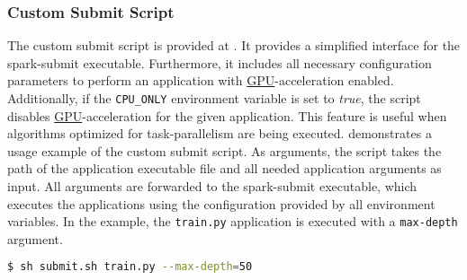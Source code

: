 \subsubsection{Custom Submit Script}
The custom submit script is provided at . It provides a simplified interface for the spark-submit executable. Furthermore, it includes all necessary configuration parameters to perform an application with \hyperlink{abbr:gpu}{GPU}-acceleration enabled. Additionally, if the \texttt{CPU\_ONLY} environment variable is set to \textit{true}, the script disables \hyperlink{abbr:gpu}{GPU}-acceleration for the given application.
This feature is useful when algorithms optimized for task-parallelism are being executed.
 demonstrates a usage example of the custom submit script.
As arguments, the script takes the path of the application executable file and all needed application arguments as input. All arguments are forwarded to the spark-submit executable, which executes the applications using the configuration provided by all environment variables. In the example, the \texttt{train.py} application is executed with a \texttt{max-depth} argument. 
\begin{lstlisting}[label=lst:06_env_depl_submit, caption=Usage of the submit script, language=bash, numbers=none]
$ sh submit.sh train.py --max-depth=50
\end{lstlisting}


